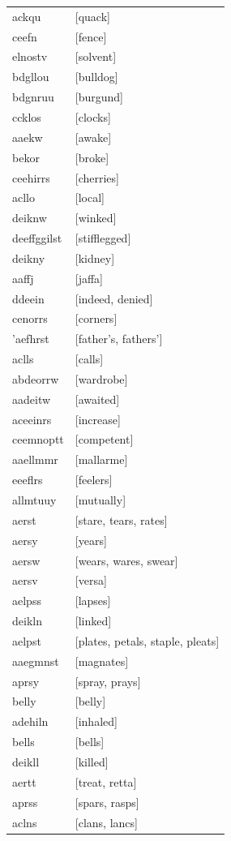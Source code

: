 \documentclass{article}
\begin{document}
\begin{tabular}{ll}
ackqu & [quack] \\
ceefn & [fence] \\
elnostv & [solvent] \\
bdgllou & [bulldog] \\
bdgnruu & [burgund] \\
ccklos & [clocks] \\
aaekw & [awake] \\
bekor & [broke] \\
ceehirrs & [cherries] \\
acllo & [local] \\
deiknw & [winked] \\
deeffggilst & [stifflegged] \\
deikny & [kidney] \\
aaffj & [jaffa] \\
ddeein & [indeed, denied] \\
cenorrs & [corners] \\
'aefhrst & [father's, fathers'] \\
aclls & [calls] \\
abdeorrw & [wardrobe] \\
aadeitw & [awaited] \\
aceeinrs & [increase] \\
ceemnoptt & [competent] \\
aaellmmr & [mallarme] \\
eeeflrs & [feelers] \\
allmtuuy & [mutually] \\
aerst & [stare, tears, rates] \\
aersy & [years] \\
aersw & [wears, wares, swear] \\
aersv & [versa] \\
aelpss & [lapses] \\
deikln & [linked] \\
aelpst & [plates, petals, staple, pleats] \\
aaegmnst & [magnates] \\
aprsy & [spray, prays] \\
belly & [belly] \\
adehiln & [inhaled] \\
bells & [bells] \\
deikll & [killed] \\
aertt & [treat, retta] \\
aprss & [spars, rasps] \\
aclns & [clans, lancs] \\

\end{tabular}
\end{document}
